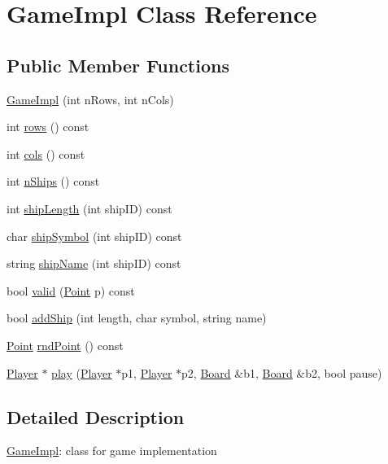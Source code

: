 \hypertarget{class_game_impl}{}\section{Game\+Impl Class Reference}
\label{class_game_impl}
\subsection*{Public Member Functions}
\begin{DoxyCompactItemize}
\item 
\mbox{\hyperlink{class_game_impl_a1ec88dfb57e180ee008cff4cf10934bf}{Game\+Impl}} (int n\+Rows, int n\+Cols)
\item 
int \mbox{\hyperlink{class_game_impl_a705c32b11b7cfaf9e8fd442c6434f7df}{rows}} () const
\item 
int \mbox{\hyperlink{class_game_impl_a73a94a0378afbe0ae9369afcdabc51ab}{cols}} () const
\item 
int \mbox{\hyperlink{class_game_impl_a15bfe27ab66ca758afaed1cc805c2f10}{n\+Ships}} () const
\item 
int \mbox{\hyperlink{class_game_impl_aa3b7b99102e9bcb3c9d06a1d3c672dc0}{ship\+Length}} (int ship\+ID) const
\item 
char \mbox{\hyperlink{class_game_impl_a1138859824715420317de50ffb15fdb9}{ship\+Symbol}} (int ship\+ID) const
\item 
string \mbox{\hyperlink{class_game_impl_ad39261b5f7198a6bacf99188e1108a50}{ship\+Name}} (int ship\+ID) const
\item 
bool \mbox{\hyperlink{class_game_impl_adae52d5fa830b6f0f0585e24cde3af3b}{valid}} (\mbox{\hyperlink{class_point}{Point}} p) const
\item 
bool \mbox{\hyperlink{class_game_impl_aef43cebeefb09e330346a30a67430345}{add\+Ship}} (int length, char symbol, string name)
\item 
\mbox{\hyperlink{class_point}{Point}} \mbox{\hyperlink{class_game_impl_a647d740893579abd77cc1d58ac600da7}{rnd\+Point}} () const
\item 
\mbox{\hyperlink{class_player}{Player}} $\ast$ \mbox{\hyperlink{class_game_impl_adf2cc88e7c3f617a7033512d05a6ba0c}{play}} (\mbox{\hyperlink{class_player}{Player}} $\ast$p1, \mbox{\hyperlink{class_player}{Player}} $\ast$p2, \mbox{\hyperlink{class_board}{Board}} \&b1, \mbox{\hyperlink{class_board}{Board}} \&b2, bool pause)
\end{DoxyCompactItemize}


\subsection{Detailed Description}
\mbox{\hyperlink{class_game_impl}{Game\+Impl}}\+: class for game implementation 

